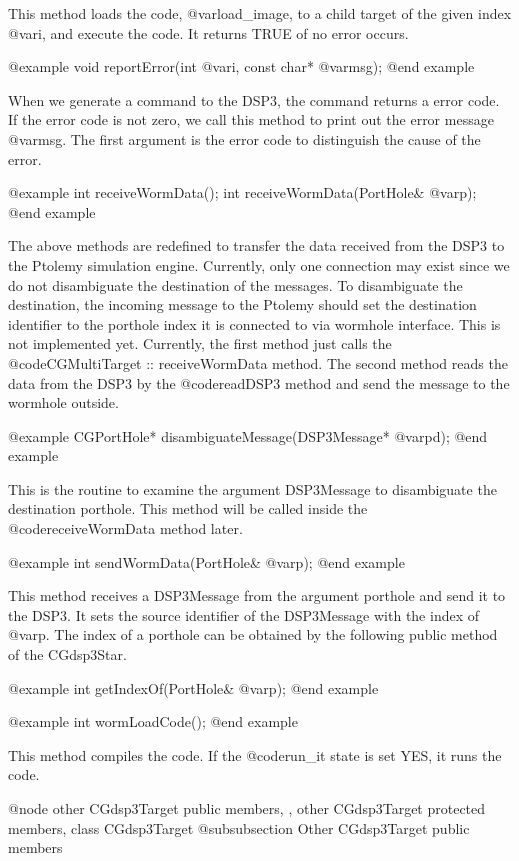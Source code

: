{This method loads the code, @var{load_image}, to a child target of 
the given index @var{i}, and execute the code. It returns TRUE of no
error occurs.

@example
void reportError(int @var{i}, const char* @var{msg});
@end example

When we generate a command to the DSP3, the command returns a error code.
If the error code is not zero, we call this method to print out the
error message @var{msg}. The first argument is the error code to distinguish
the cause of the error.

@example
int receiveWormData();
int receiveWormData(PortHole& @var{p});
@end example

The above methods are redefined to transfer the data received from the
DSP3 to the Ptolemy simulation engine. Currently, only one connection may
exist since we do not disambiguate the destination of the messages.
To disambiguate the destination, the incoming message to the Ptolemy
should set the destination identifier to the porthole index it is connected
to via wormhole interface. This is not implemented yet. Currently, the
first method just calls the @code{CGMultiTarget :: receiveWormData} method.
The second method reads the data from the DSP3 by the @code{readDSP3} method
and send the message to the wormhole outside.

@example
CGPortHole* disambiguateMessage(DSP3Message* @var{pd});
@end example

This is the routine to examine the argument DSP3Message to disambiguate
the destination porthole. This method will be called inside the
@code{receiveWormData} method later. 

@example
int sendWormData(PortHole& @var{p});
@end example

This method receives a DSP3Message from the argument porthole and send it
to the DSP3. It sets the source identifier of the DSP3Message with the
index of @var{p}. The index of a porthole can be obtained
by the following public method of the CGdsp3Star.

@example
int getIndexOf(PortHole& @var{p});
@end example

@example
int wormLoadCode();
@end example

This method compiles the code. If the @code{run_it} state is set YES,
it runs the code.

@node other CGdsp3Target public members, , other CGdsp3Target protected members, class CGdsp3Target
@subsubsection Other CGdsp3Target public members

}
